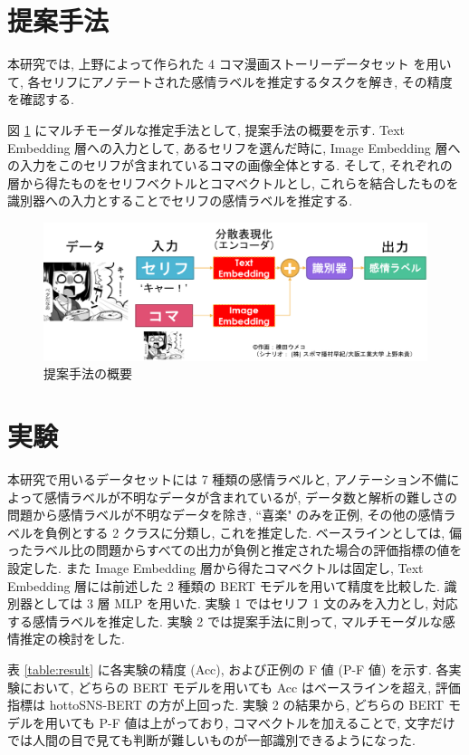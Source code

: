 \documentclass[a4paper,twoside,twocolumn,10pt]{jarticle}     %
\begin{document}
\section{提案手法}
本研究では, 上野によって作られた 4 コマ漫画ストーリーデータセット \cite{ueno_miki2018} を用いて,
各セリフにアノテートされた感情ラベルを推定するタスクを解き, その精度を確認する.

図 \ref{fig:teian} にマルチモーダルな推定手法として, 提案手法の概要を示す.
Text Embedding 層への入力として, あるセリフを選んだ時に, Image Embedding 層への入力をこのセリフが含まれているコマの画像全体とする. そして, それぞれの層から得たものをセリフベクトルとコマベクトルとし, これらを結合したものを識別器への入力とすることでセリフの感情ラベルを推定する.

\begin{figure}[!th]
  \centering
  \includegraphics[scale=0.25]{teian.png}
  \caption{提案手法の概要}
  \label{fig:teian}
\end{figure}
\section{実験}
本研究で用いるデータセットには 7 種類の感情ラベルと,
アノテーション不備によって感情ラベルが不明なデータが含まれているが,
データ数と解析の難しさの問題から感情ラベルが不明なデータを除き, ``喜楽" のみを正例, その他の感情ラベルを負例とする 2 クラスに分類し, これを推定した. ベースラインとしては, 偏ったラベル比の問題からすべての出力が負例と推定された場合の評価指標の値を設定した. また Image Embedding 層から得たコマベクトルは固定し, Text Embedding 層には前述した 2 種類の BERT モデルを用いて精度を比較した. 識別器としては 3 層 MLP を用いた. 実験 1 ではセリフ 1 文のみを入力とし, 対応する感情ラベルを推定した. 実験 2 では提案手法に則って, マルチモーダルな感情推定の検討をした.

表 \ref{table:result} に各実験の精度 (Acc), および正例の F 値 (P-F 値) を示す. 各実験において, どちらの BERT モデルを用いても Acc はベースラインを超え, 評価指標は hottoSNS-BERT の方が上回った. 実験 2 の結果から, どちらの BERT モデルを用いても P-F 値は上がっており, コマベクトルを加えることで, 文字だけでは人間の目で見ても判断が難しいものが一部識別できるようになった.
\end{document}
